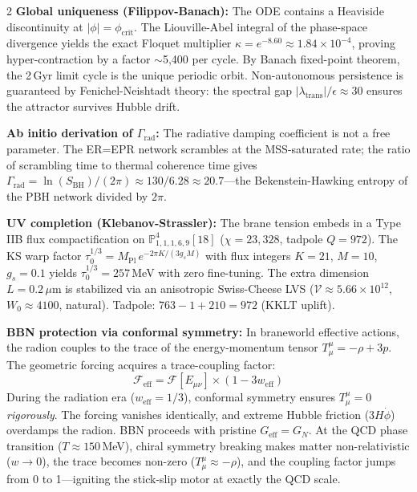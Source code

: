 \documentclass[11pt]{article}
\begin{document}
\begin{multicols}{2}
\textbf{Global uniqueness (Filippov-Banach):} The ODE contains a Heaviside discontinuity at $|\phi| = \phi_\text{crit}$. The Liouville-Abel integral of the phase-space divergence yields the exact Floquet multiplier $\kappa = e^{-8.60} \approx 1.84 \times 10^{-4}$, proving hyper-contraction by a factor $\sim$5,400 per cycle. By Banach fixed-point theorem, the 2\,Gyr limit cycle is the unique periodic orbit. Non-autonomous persistence is guaranteed by Fenichel-Neishtadt theory: the spectral gap $|\lambda_\text{trans}|/\epsilon \approx 30$ ensures the attractor survives Hubble drift.

\textbf{Ab initio derivation of $\Gamma_\text{rad}$:} The radiative damping coefficient is not a free parameter. The ER=EPR network scrambles at the MSS-saturated rate; the ratio of scrambling time to thermal coherence time gives $\Gamma_\text{rad} = \ln(S_\text{BH})/(2\pi) \approx 130/6.28 \approx 20.7$---the Bekenstein-Hawking entropy of the PBH network divided by $2\pi$.

\textbf{UV completion (Klebanov-Strassler):} The brane tension embeds in a Type IIB flux compactification on $\mathbb{P}^4_{1,1,1,6,9}[18]$ ($\chi = 23{,}328$, tadpole $Q = 972$). The KS warp factor $\tau_0^{1/3} = M_\text{Pl}\,e^{-2\pi K/(3g_sM)}$ with flux integers $K = 21$, $M = 10$, $g_s = 0.1$ yields $\tau_0^{1/3} = 257$\,MeV with zero fine-tuning. The extra dimension $L = 0.2\,\mu$m is stabilized via an anisotropic Swiss-Cheese LVS ($\mathcal{V} \approx 5.66 \times 10^{12}$, $W_0 \approx 4100$, natural). Tadpole: $763 - 1 + 210 = 972$ (KKLT uplift).

\textbf{BBN protection via conformal symmetry:} In braneworld effective actions, the radion couples to the trace of the energy-momentum tensor $T^\mu_\mu = -\rho + 3p$. The geometric forcing acquires a trace-coupling factor:
\begin{equation}
\mathcal{F}_\text{eff} = \mathcal{F}[E_{\mu\nu}] \times (1 - 3w_\text{eff})
\end{equation}
During the radiation era ($w_\text{eff} = 1/3$), conformal symmetry ensures $T^\mu_\mu = 0$ \textit{rigorously}. The forcing vanishes identically, and extreme Hubble friction ($3H\dot{\phi}$) overdamps the radion. BBN proceeds with pristine $G_\text{eff} = G_N$. At the QCD phase transition ($T \approx 150$\,MeV), chiral symmetry breaking makes matter non-relativistic ($w \to 0$), the trace becomes non-zero ($T^\mu_\mu \approx -\rho$), and the coupling factor jumps from 0 to 1---igniting the stick-slip motor at exactly the QCD scale.


\end{multicols}
\end{document}
